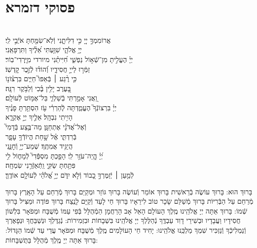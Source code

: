 \documentclass[twoside, openany, parskip=half, 11pt]{book}
\begin{document}
\section[פסוקי דזמרא]{ פסוקי דזמרא }
  \\
אֲרוֹמִמְךָ֣ יְיָ֭ כִּ֣י דִלִּיתָ֑נִי \hfill וְֿלֹֽא־שִׂמַּ֖חְתָּ אֹיְֿבַ֣י לִֽי׃\\
יְיָ֥ אֱלֹהָ֑י \hfill שִׁוַּ֥עְתִּי אֵ֝לֶ֗יךָ וַתִּרְפָּאֵֽנִי׃\\
יְיָ֗ הֶעֱלִ֣יתָ מִן־שְֿׁא֣וֹל נַפְשִׁ֑י \hfill חִ֝יִּיתַ֗נִי מיורדי מִיׇּֽרְדִי־בֽוֹר׃\\
זַמְּֿר֣וּ לַייָ֣ חֲסִידָ֑יו \hfill וְֿ֝הוֹד֗וּ לְֿזֵ֣כֶר קׇדְשֽׁוֹ׃\\
כִּ֤י רֶ֨גַע ׀ בְּֿאַפּוֹ֮ \hfill חַיִּ֢ים בִּרְצ֫וֹנ֥וֹ\\
בָּ֭עֶרֶב יָלִ֥ין בֶּ֗כִי \hfill וְֿלַבֹּ֥קֶר רִנָּֽה׃\\
וַ֭אֲנִי אָמַ֣רְתִּי בְֿשַׁלְוִ֑י \hfill בַּל־אֶמּ֥וֹט לְֿעוֹלָֽם׃\\
יְיָ֗ בִּרְצוֹנְֿךָ֮ הֶעֱמַ֢דְתָּה לְֽֿהַרְרִ֫י עֹ֥ז \hfill הִסְתַּ֥רְתָּ פָנֶ֗יךָ\\
הָיִ֥יתִי נִבְהָֽל׃ \hfill אֵלֶ֣יךָ יְיָ֣ אֶקְרָ֑א \\
וְֿאֶל־אֲ֝דֹנָ֗י אֶתְחַנָּֽן׃ \hfill מַה־בֶּ֥צַע בְּֿדָמִי֮\\
בְּֿרִדְתִּ֢י אֶ֫ל שָׁ֥חַת \hfill הֲיוֹדְֿךָ֥ עָפָ֑ר\\
הֲיַגִּ֥יד אֲמִתֶּֽךָ׃ \hfill שְׁמַע־יְיָ֥ וְֿחׇנֵּ֑נִי\\
יְ֝יָ֗ הֱֽיֵה־עֹזֵ֥ר לִֽי׃ \hfill הָפַ֣כְתָּ מִסְפְּֿֿדִי֮ לְֿמָח֢וֹל לִ֥י\\
פִּתַּ֥חְתָּ שַׂקִּ֑י \hfill וַֽתְּֿאַזְּֿרֵ֥נִי שִׂמְחָֽה׃\\
לְֿמַ֤עַן ׀ יְֿזַמֶּרְךָ֣ כָ֭בוֹד וְֿלֹ֣א יִדֹּ֑ם \hfill יְיָ֥ אֱ֝לֹהַ֗י לְֿעוֹלָ֥ם אוֹדֶֽךָּ׃ \\
\mournerskaddish


בָּרוּךְ הוּא:
בָּרוּךְ עוֹשֶׂה בְֿרֵאשִׁית בָּרוּךְ אוֹמֵר וְֿעוֹשֶׂה
בָּרוּךְ גּוֹזֵר וּמְקַיֵּם בָּרוּךְ מְֿרַחֵם עַל הָאָֽרֶץ
בָּרוּךְ מְֿרַחֵם עַל הַבְּֿרִיּוֹת בָּרוּךְ מְֿשַׁלֵּם שָׂכָר טוֹב לִירֵאָיו
בָּרוּךְ חַי לָעַד וְֿקַיָּם לָנֶֽצַח בָּרוּךְ פּוֹדֶה וּמַצִּיל בָּרוּךְ שְֿׁמוֹ:
בָּרוּךְ אַתָּה יְיָ אֱלֹהֵֽינוּ מֶֽלֶךְ הָעוֹלָם הָאֵל אָב הָרַחֲמָן הַמְֿהֻלָּל בְּֿפִי עַמּוֹ מְֿשֻׁבָּח וּמְפֹאָר בִּלְשׁוֹן חֲסִידָיו וַעֲבָדָיו וּבְשִׁירֵי דָוִד עַבְדֶּֽךָ נְֿהַלֶּלְךָ יְיָ אֱלֹהֵֽינוּ בִּשְׁבָחוֹת וּבִזְמִירוֹת: נְֿגַדֶּלְךָ וּנְשַׁבֵּחֲךָ וּנְפָאֶרְךָ וְֿנַמְלִיכְֿךָ וְֿנַזְכִּיר שִׁמְךָ מַלְכֵּֽנוּ אֱלֹהֵֽינוּ:
 יָחִיד חַי הָעוֹלָמִים מֶֽלֶךְ מְֿשֻׁבָּח וּמְפֹאָר עֲדֵי עַד שְֿׁמוֹ הַגָּדוֹל: בָּרוּךְ אַתָּה יְיָ מֶֽלֶךְ מְֿהֻלָּל בַּתֻּשְׁבָּחוֹת:
\end{document}
